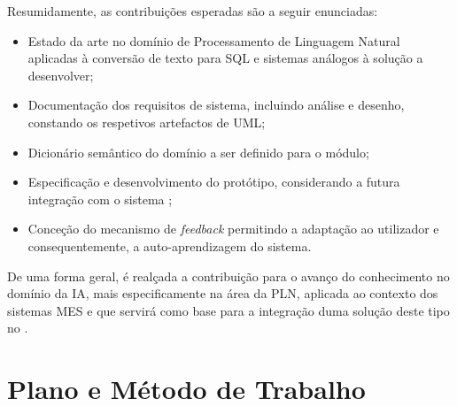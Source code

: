 Resumidamente, as contribuições esperadas são a seguir enunciadas:

\begin{itemize}
    \item
    {
        Estado da arte no domínio de Processamento de Linguagem Natural aplicadas à conversão de texto para \gls{SQL} e sistemas análogos à solução a desenvolver;
    }
    \item 
    {
        Documentação dos requisitos de sistema, incluindo análise e desenho, constando os respetivos artefactos de \gls{UML};
    }
    \item 
    {
        Dicionário semântico do domínio a ser definido para o módulo;
    }
    \item
    {
        Especificação e desenvolvimento do protótipo, considerando a futura integração com o sistema {\productname};
    }
    \item
    {
        Conceção do mecanismo de \textit{feedback} permitindo a adaptação ao utilizador e consequentemente, a auto-aprendizagem do sistema.
    }
\end{itemize}

De uma forma geral, é realçada a contribuição para o avanço do conhecimento no domínio da \gls{IA}, mais especificamente na área da \gls{PLN}, aplicada ao contexto dos sistemas \gls{MES} e que servirá como base para a integração duma solução deste tipo no {\productname}.







\chapter{Plano e Método de Trabalho}
\label{chap:pre7}

